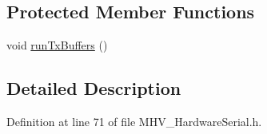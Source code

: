 \subsection*{\-Protected \-Member \-Functions}
\begin{DoxyCompactItemize}
\item 
void \hyperlink{class_m_h_v___hardware_serial_a8801ff1e85b487e233737a9591131f02}{run\-Tx\-Buffers} ()
\end{DoxyCompactItemize}


\subsection{\-Detailed \-Description}


\-Definition at line 71 of file \-M\-H\-V\-\_\-\-Hardware\-Serial.\-h.



